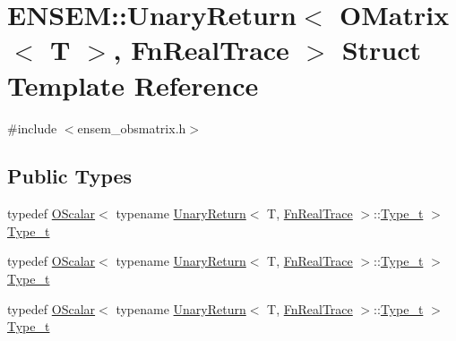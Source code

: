 \hypertarget{structENSEM_1_1UnaryReturn_3_01OMatrix_3_01T_01_4_00_01FnRealTrace_01_4}{}\section{E\+N\+S\+EM\+:\+:Unary\+Return$<$ O\+Matrix$<$ T $>$, Fn\+Real\+Trace $>$ Struct Template Reference}
\label{structENSEM_1_1UnaryReturn_3_01OMatrix_3_01T_01_4_00_01FnRealTrace_01_4}


{\ttfamily \#include $<$ensem\+\_\+obsmatrix.\+h$>$}

\subsection*{Public Types}
\begin{DoxyCompactItemize}
\item 
typedef \mbox{\hyperlink{classENSEM_1_1OScalar}{O\+Scalar}}$<$ typename \mbox{\hyperlink{structENSEM_1_1UnaryReturn}{Unary\+Return}}$<$ T, \mbox{\hyperlink{structENSEM_1_1FnRealTrace}{Fn\+Real\+Trace}} $>$\+::\mbox{\hyperlink{structENSEM_1_1UnaryReturn_3_01OMatrix_3_01T_01_4_00_01FnRealTrace_01_4_aaaa039ed6375a6c096ce155e79a2c9cd}{Type\+\_\+t}} $>$ \mbox{\hyperlink{structENSEM_1_1UnaryReturn_3_01OMatrix_3_01T_01_4_00_01FnRealTrace_01_4_aaaa039ed6375a6c096ce155e79a2c9cd}{Type\+\_\+t}}
\item 
typedef \mbox{\hyperlink{classENSEM_1_1OScalar}{O\+Scalar}}$<$ typename \mbox{\hyperlink{structENSEM_1_1UnaryReturn}{Unary\+Return}}$<$ T, \mbox{\hyperlink{structENSEM_1_1FnRealTrace}{Fn\+Real\+Trace}} $>$\+::\mbox{\hyperlink{structENSEM_1_1UnaryReturn_3_01OMatrix_3_01T_01_4_00_01FnRealTrace_01_4_aaaa039ed6375a6c096ce155e79a2c9cd}{Type\+\_\+t}} $>$ \mbox{\hyperlink{structENSEM_1_1UnaryReturn_3_01OMatrix_3_01T_01_4_00_01FnRealTrace_01_4_aaaa039ed6375a6c096ce155e79a2c9cd}{Type\+\_\+t}}
\item 
typedef \mbox{\hyperlink{classENSEM_1_1OScalar}{O\+Scalar}}$<$ typename \mbox{\hyperlink{structENSEM_1_1UnaryReturn}{Unary\+Return}}$<$ T, \mbox{\hyperlink{structENSEM_1_1FnRealTrace}{Fn\+Real\+Trace}} $>$\+::\mbox{\hyperlink{structENSEM_1_1UnaryReturn_3_01OMatrix_3_01T_01_4_00_01FnRealTrace_01_4_aaaa039ed6375a6c096ce155e79a2c9cd}{Type\+\_\+t}} $>$ \mbox{\hyperlink{structENSEM_1_1UnaryReturn_3_01OMatrix_3_01T_01_4_00_01FnRealTrace_01_4_aaaa039ed6375a6c096ce155e79a2c9cd}{Type\+\_\+t}}
\end{DoxyCompactItemize}


